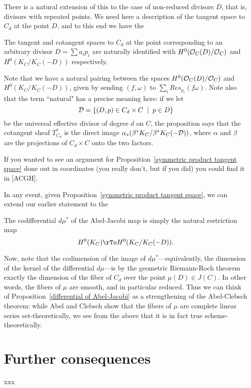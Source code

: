 There is a natural extension of this to the case of non-reduced divisors $D$, that is, divisors with repeated points. We need here a description of the tangent space to $C_d$ at the point $D$, and to this end we have the

\begin{proposition}\label{symmetric product tangent space}
The tangent and cotangent spaces to $C_d$ at the point corresponding to an arbitrary divisor $D = \sum a_ip_i$ are naturally identified with $H^0(\cO_C(D)/\cO_C)$ and $H^0(K_C/K_C(-D))$ respectively.
\end{proposition}

Note that we have a natural pairing between the spaces $H^0(\cO_C(D)/\cO_C)$ and $H^0(K_C/K_C(-D))$, given by sending $(f, \omega)$ to $\sum_i Res_{p_i}(f\omega)$. Note also that the term ``natural" has a precise meaning here: if we let 
$$
\cD = \{ (D, p) \in C_d \times C \; \mid \; p \in D \}
$$
be the universal effective divisor of degree $d$ on $C$, the proposition says that the cotangent sheaf $T^*_{C_d}$ is the direct image $\alpha_*(\beta^*K_C/\beta^*K_C(-\cD))$, where $\alpha$ and $\beta$ are the projections of $C_d \times C$ onto the two factors.

If you wanted to see an argument for Proposition~\ref{symmetric product tangent space} done out in coordinates (you really don't, but if you did) you could find it in [ACGH].

In any event, given Proposition~\ref{symmetric product tangent space}, we can extend our earlier statement to the

\begin{proposition}\label{differential of Abel-Jacobi}
The codifferential $d\mu^*$ of the Abel-Jacobi map is simply the natural restriction map
$$
H^0(K_C) \rTo H^0(K_C/K_C(-D)).
$$
\end{proposition}

Now, note that the codimension of the image of $d\mu^*$---equivalently, the dimension of the kernel of the differential $d\mu$---is by the geometric Riemann-Roch theorem exactly the dimension of the fiber of $C_d$ over the point $\mu(D) \in J(C)$. In other words, the fibers of $\mu$ are smooth, and in particular reduced. Thus we can think of Proposition~\ref{differential of Abel-Jacobi} as a strengthening of the Abel-Clebsch theorem: while Abel and Clebsch show that the fibers of $\mu$ are complete linear series set-theoretically, we see from the above that it is in fact true scheme-theoretically.

\section{Further consequences}

xxx



